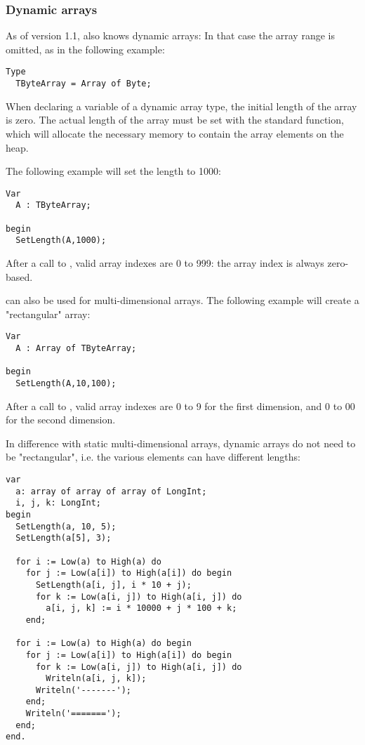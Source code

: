 \subsubsection{Dynamic arrays}
As of version 1.1, \fpc also knows dynamic arrays: In that case the array
range is omitted, as in the following example:
\begin{verbatim}
Type
  TByteArray = Array of Byte;
\end{verbatim}
When declaring a variable of a dynamic array type, the initial length of the
array is zero. The actual length of the array must be set with the standard
 function, which will allocate the necessary memory to contain 
the array elements on the heap. 

The following example will set the length to 1000:
\begin{verbatim}
Var 
  A : TByteArray;

begin
  SetLength(A,1000);
\end{verbatim}
After a call to , valid array indexes are 0 to 999: the array
index is always zero-based.

 can also be used for multi-dimensional arrays. The following example will create
a "rectangular" array:
\begin{verbatim}
Var 
  A : Array of TByteArray;

begin
  SetLength(A,10,100);
\end{verbatim}
After a call to , valid array indexes are 0 to 9 for the
first dimension, and 0 to 00 for the second dimension.

In difference with static multi-dimensional arrays, dynamic arrays do not
need to be "rectangular", i.e. the various elements can have different
lengths:
\begin{verbatim}
var
  a: array of array of array of LongInt;
  i, j, k: LongInt;
begin
  SetLength(a, 10, 5);
  SetLength(a[5], 3);

  for i := Low(a) to High(a) do
    for j := Low(a[i]) to High(a[i]) do begin
      SetLength(a[i, j], i * 10 + j);
      for k := Low(a[i, j]) to High(a[i, j]) do
        a[i, j, k] := i * 10000 + j * 100 + k;
    end;

  for i := Low(a) to High(a) do begin
    for j := Low(a[i]) to High(a[i]) do begin
      for k := Low(a[i, j]) to High(a[i, j]) do
        Writeln(a[i, j, k]);
      Writeln('-------');
    end;
    Writeln('=======');
  end;
end.
\end{verbatim}

